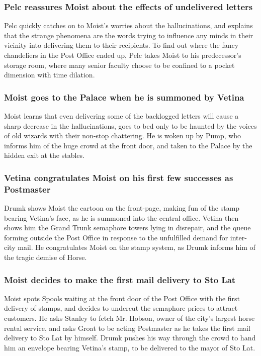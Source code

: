 \subsubsection{\Gls{Pelc} reassures \Gls{Moist} about the effects of undelivered letters}
\Gls{Pelc} quickly catches on to \Gls{Moist}'s worries about the hallucinations, and explains that
the strange phenomena are the words trying to influence any minds in their vicinity into delivering
them to their recipients. To find out where the fancy chandeliers in the Post Office ended up,
\Gls{Pelc} takes \Gls{Moist} to his predecessor's storage room, where many senior faculty choose to
be confined to a pocket dimension with time dilation.

\subsubsection{\Gls{Moist} goes to the Palace when he is summoned by \Gls{Vetina}}
\Gls{Moist} learns that even delivering some of the backlogged letters will cause a sharp decrease
in the hallucinations, goes to bed only to be haunted by the voices of old wizards with their
non-stop chattering. He is woken up by \Gls{Pump}, who informs him of the huge crowd at the front
door, and taken to the Palace by the hidden exit at the stables.

\subsubsection{\Gls{Vetina} congratulates \Gls{Moist} on his first few successes as Postmaster}
\Gls{Drumk} shows \Gls{Moist} the cartoon on the front-page, making fun of the stamp bearing
\Gls{Vetina}'s face, as he is summoned into the central office. \Gls{Vetina} then shows him the
Grand Trunk semaphore towers lying in disrepair, and the queue forming outside the Post Office in
response to the unfulfilled demand for inter-city mail. He congratulates \Gls{Moist} on the stamp
system, as \Gls{Drumk} informs him of the tragic demise of \Gls{Horse}.

\subsubsection{\Gls{Moist} decides to make the first mail delivery to Sto Lat}
\Gls{Moist} spots \Gls{Spools} waiting at the front door of the Post Office with the first delivery
of stamps, and decides to undercut the semaphore prices to attract customers. He asks \Gls{Stanley}
to fetch Mr. \Gls{Hobson}, owner of the city's largest horse rental service, and asks \Gls{Groat} to
be acting Postmaster as he takes the first mail delivery to Sto Lat by himself. \Gls{Drumk} pushes
his way through the crowd to hand him an envelope bearing \Gls{Vetina}'s stamp, to be delivered to
the mayor of Sto Lat.

